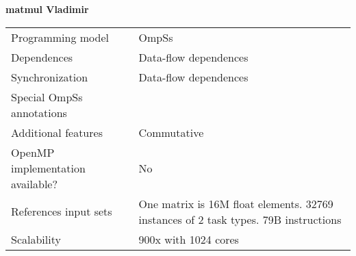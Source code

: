 \section*{}
\label{matmul_vladimir}
\centering
\Huge
\textbf{matmul Vladimir}

\begin{table}[h!]
  \large
  \centering
  \begin{tabular}{|l|l|}
    \hline
    Programming model                & OmpSs \\
    Dependences                      & Data-flow dependences \\
    Synchronization                  & Data-flow dependences \\
    Special OmpSs annotations        &  \\
    Additional features              & Commutative \\
    OpenMP implementation available? & No \\
    References input sets            & One matrix is 16M float elements. 32769 instances of 2 task types. 79B instructions\\
    Scalability                      & 900x with 1024 cores \\
    \hline
  \end{tabular}
\end{table}

\newpage
